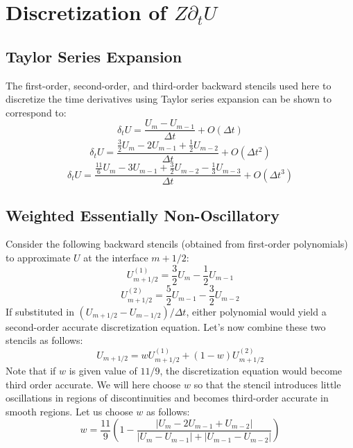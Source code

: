 \documentclass{warpdoc}
\begin{document}
\section{Discretization of $Z\partial_t U$}

\subsection{Taylor Series Expansion}

The first-order, second-order, and third-order backward stencils used here to discretize the time derivatives using Taylor series expansion can be shown to correspond to:
%
\begin{equation}
  \delta_t U =  \frac{U_{m}-U_{m-1}}{\Delta t} + O(\Delta t)
\end{equation}
%
%
\begin{equation}
  \delta_t U =  \frac{\frac{3}{2} U_{m}
                       -2 U_{m-1} + \frac{1}{2} U_{m-2}}{\Delta t} + O(\Delta t^2)
\end{equation}
%
%
\begin{equation}
  \delta_t U =  \frac{\frac{11}{6}U_{m}-3 U_{m-1} + \frac{3}{2} U_{m-2} - \frac{1}{3} U_{m-3} }{\Delta t} + O(\Delta t^3)
\end{equation}
%

\subsection{Weighted Essentially Non-Oscillatory}

Consider the following backward stencils (obtained from first-order polynomials) to approximate $U$ at the interface $m+1/2$:
%
\begin{equation}
  U^{(1)}_{m+1/2}=\frac{3}{2} U_{m} - \frac{1}{2} U_{m-1}
\end{equation}
% 
%
\begin{equation}
  U^{(2)}_{m+1/2}=\frac{5}{2} U_{m-1} - \frac{3}{2} U_{m-2}
\end{equation}
% 
If substituted in  $(U_{m+1/2}-U_{m-1/2})/\Delta t$, either polynomial would
yield a second-order accurate discretization equation. Let's now combine these two stencils as follows:
%
\begin{equation}
  U_{m+1/2}=w U^{(1)}_{m+1/2} + (1-w) U^{(2)}_{m+1/2}
\end{equation}
%
Note that if $w$ is given value of $11/9$, the discretization equation would become third order accurate. We will here choose $w$ so that the stencil introduces little oscillations in regions of discontinuities and becomes third-order accurate in smooth regions. Let us choose $w$ as follows:
%
\begin{equation}
w=\frac{11}{9}\left(1-\frac{|U_{m}-2 U_{m-1}+U_{m-2}|}{|U_{m}-U_{m-1}|+|U_{m-1}-U_{m-2}|}\right)
\end{equation}
% 



\end{document}
